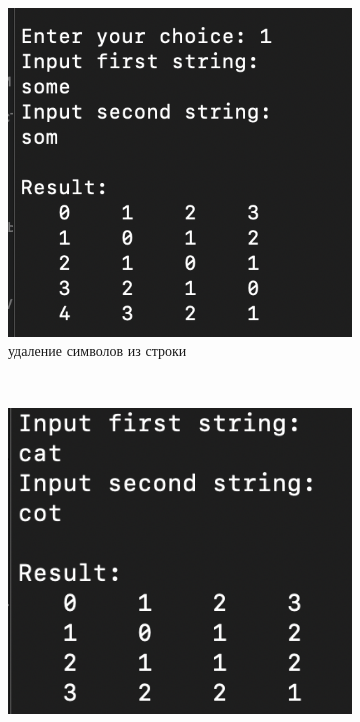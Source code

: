\documentclass[12pt,a4paper,oneside]{report}
\begin{document}
\begin{figure}[H]
	\centering
	
	\begin{subfigure}[b]{0.3\textwidth}
		\includegraphics[width=\linewidth]{delete}
		\caption{удаление символов из строки}
	\end{subfigure}
	~
	\begin{subfigure}[b]{0.3\textwidth}
		\includegraphics[width=\linewidth]{replace}

\end{subfigure}
\end{figure}
\end{document}

